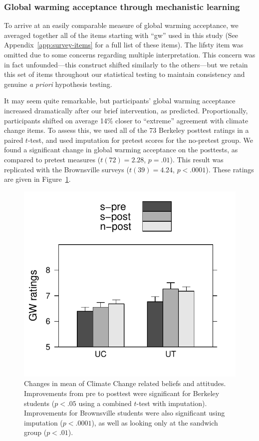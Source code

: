 \subsubsection{Global warming acceptance through mechanistic learning}

To arrive at an easily comparable measure of global warming acceptance, we
averaged together all of the items starting with “\textsf{gw}” used in this
study (See Appendix~\ref{app:survey-items} for a full list of these items).
The \textsf{lifsty} item was omitted due to some concerns regarding multiple
interpretation. This concern was in fact unfounded---this construct shifted
similarly to the others---but we retain this set of items throughout our
statistical testing to maintain consistency and genuine \emph{a priori}
hypothesis testing. 

It may seem quite remarkable, but participants’ global warming acceptance
increased dramatically after our brief intervention, as predicted.
Proportionally, participants shifted on average 14\% closer to ``extreme''
agreement with climate change items. To assess this, we used all of the 73
Berkeley posttest ratings in a paired $t$-test, and used imputation for pretest
scores for the no-pretest group. We found a significant change in global warming
acceptance on the posttests, as compared to pretest measures ($t(72) = 2.28$, $p
= .01$). This result was replicated with the Brownsville surveys ($t(39) =
4.24$, $p < .0001$). These ratings are given in
Figure~\ref{fig:class-gw-ratings}.

\begin{figure}
    \centering
    \includegraphics{class-gw-ratings.pdf}
    \caption{Changes in mean of Climate Change related beliefs and attitudes.
        Improvements from pre to posttest were significant for
        Berkeley students ($p < .05$ using a combined $t$-test with imputation).
        Improvements for Brownsville students were also significant using
        imputation ($p < .0001$), as well as looking only at the sandwich group
        ($p < .01$).}
    \label{fig:class-gw-ratings}
\end{figure}

